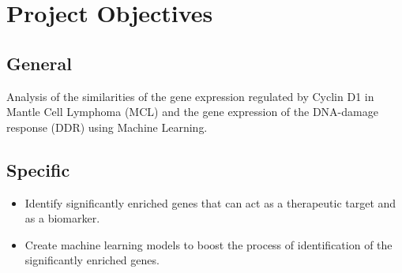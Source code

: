 
\section{Project Objectives}
\subsection{General}
Analysis of the similarities of the gene expression regulated by Cyclin D1 in Mantle Cell Lymphoma (MCL) and the gene expression of the DNA-damage response (DDR) using Machine Learning.

\subsection{Specific}

\begin{itemize}
    \item Identify significantly enriched genes that can act as a therapeutic target and as a biomarker.
    \item Create machine learning models to boost the process of identification of the significantly enriched genes.
\end{itemize}

